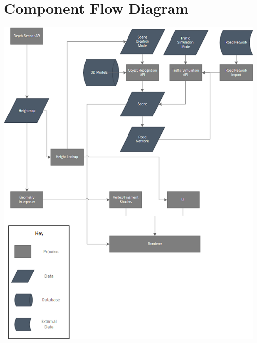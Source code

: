 \documentclass[letterpaper, 10pt, onecolumn, draftclsnofoot]{IEEEtran}
\begin{document}
    \section{Component Flow Diagram}
    \label{ComponentFlowDiagram}
        \begin{center}
        \includegraphics{ComponentFlowDiagram.png}
        \end{center}

\newpage


        
\end{document}
